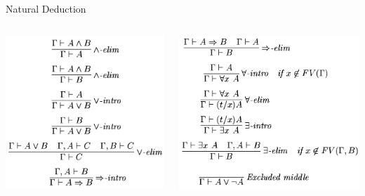 \documentclass[../231120_msquare_computational-logic.tex]{subfiles}
\begin{document}
\begin{frame}{Natural Deduction}
\begin{columns}
\begin{column}{0.3\textwidth}
\begin{center}
        \includegraphics[width=1.2\textwidth]{./natural_deduction_2.png}
        \end{center}
    \end{column}
    \begin{column}{0.3\textwidth}
        \begin{center}
        \includegraphics[width=1.1\textwidth]{./natural_deduction_3.png}
        \end{center}
    \end{column}
    \end{columns}
    \pause


\end{frame}
\end{document}
